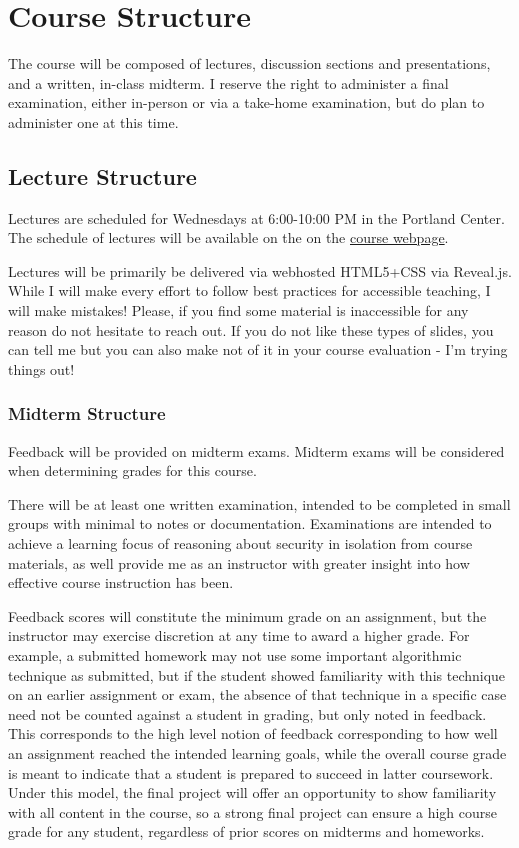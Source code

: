 \documentclass[11pt]{article}
\begin{document}

\section*{Course Structure}

The course will be composed of lectures, discussion sections and presentations, and a written, in-class midterm. I reserve the right to administer a final examination, either in-person or via a take-home examination, but do plan to administer one at this time.

\subsection*{Lecture Structure}

Lectures are scheduled for Wednesdays at 6:00-10:00 PM in the Portland Center. The schedule
of lectures will be available on the on the \href{https://cd-public.github.io/courses/secs24}{course webpage}.

\bigskip
\noindent Lectures will be primarily be delivered via webhosted HTML5+CSS via Reveal.js. While I will make every effort to follow best practices for accessible teaching, I will make mistakes! Please, if you find some material is inaccessible for any reason
do not hesitate to reach out. If you do not like these types of slides, you can tell me but you can also make not of it in your course evaluation - I'm trying things out!

\subsubsection*{Midterm Structure}

Feedback will be provided on midterm exams.  Midterm exams will be considered when determining grades for this course.

\bigskip
\noindent There will be at least one written examination, intended to be completed in small groups
with minimal to notes or documentation. Examinations are intended to achieve a learning
focus of reasoning about security in isolation from course materials,
as well provide me as an instructor with greater insight into how effective course
instruction has been.

\noindent Feedback scores will constitute the minimum grade on an assignment, but the instructor
may exercise discretion at any time to award a higher grade. For example, a submitted homework
may not use some important algorithmic technique as submitted, but if the student showed familiarity
with this technique on an earlier assignment or exam, the absence of that technique in a specific
case need not be counted against a student in grading, but only noted in feedback. This corresponds to the high level notion of feedback corresponding to how well an assignment reached the intended learning goals, while the overall course grade is meant to indicate that a student is prepared to succeed in latter coursework. Under this model, the final project will offer an opportunity to show familiarity with all content in the course, so a strong final project can ensure a high course grade
for any student, regardless of prior scores on midterms and homeworks.
\end{document}
